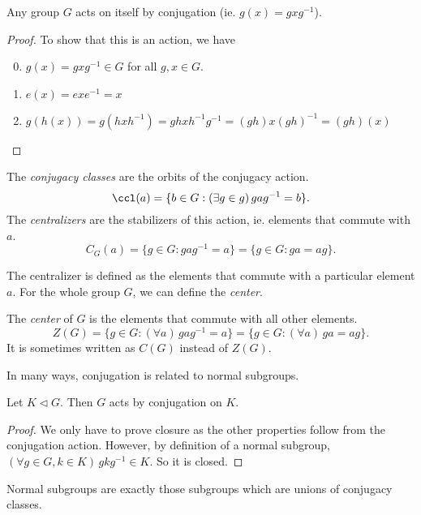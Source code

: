 \documentclass[a4paper]{article}
\begin{document}
\begin{lemma}
  Any group $G$ acts on itself by conjugation (ie. $g(x) = gxg^{-1}$).
\end{lemma}

\begin{proof}
  To show that this is an action, we have
  \begin{enumerate}[label=\arabic{*}.]
      \setcounter{enumi}{-1}
    \item $g(x) = gxg^{-1} \in G$ for all $g, x\in G$.
    \item $e(x) = exe^{-1} = x$
    \item $g(h(x)) = g(hxh^{-1}) = ghxh^{-1}g^{-1} = (gh)x(gh)^{-1} = (gh)(x)$
  \end{enumerate}
\end{proof}

\begin{defi}
  The \emph{conjugacy classes} are the orbits of the conjugacy action.
  \[
    \ccl(a) = \{b\in G: (\exists g\in g)\,gag^{-1} = b\}.
  \]
  The \emph{centralizers} are the stabilizers of this action, ie. elements that commute with $a$.
  \[
    C_G(a) = \{g\in G: gag^{-1} = a\} = \{g\in G: ga = ag\}.
  \]
\end{defi}
The centralizer is defined as the elements that commute with a particular element $a$. For the whole group $G$, we can define the \emph{center}.

\begin{defi}
  The \emph{center} of $G$ is the elements that commute with all other elements.
  \[
    Z(G) = \{g\in G: (\forall a)\,gag^{-1} = a\} = \{g\in G: (\forall a)\,ga = ag\}.
  \]
  It is sometimes written as $C(G)$ instead of $Z(G)$.
\end{defi}

In many ways, conjugation is related to normal subgroups.
\begin{lemma}
  Let $K\lhd G$. Then $G$ acts by conjugation on $K$.
\end{lemma}

\begin{proof}
  We only have to prove closure as the other properties follow from the conjugation action. However, by definition of a normal subgroup, $(\forall g\in G, k\in K)\,gkg^{-1}\in K$.  So it is closed.
\end{proof}

\begin{prop}
  Normal subgroups are exactly those subgroups which are unions of conjugacy classes.
\end{prop}
\end{document}
